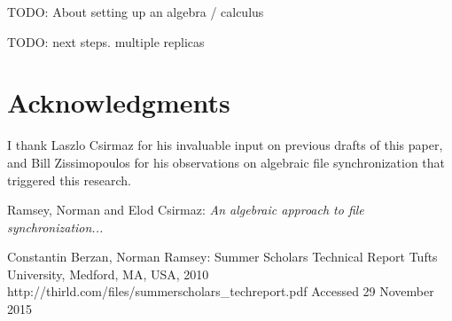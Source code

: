 \documentclass[12pt]{article}
\begin{document}
TODO: About setting up an algebra / calculus

TODO: next steps. multiple replicas

\section{Acknowledgments}

I thank Laszlo Csirmaz for his invaluable input on previous drafts of this paper,
and Bill Zissimopoulos for his observations on algebraic file synchronization that triggered this research.



\begin{thebibliography}{99}

 Ramsey, Norman and Elod Csirmaz: {\it An algebraic approach to
file synchronization...}

 Constantin Berzan, Norman Ramsey: Summer Scholars Technical Report
Tufts University, Medford, MA, USA, 2010
http://thirld.com/files/summerscholars\_techreport.pdf
Accessed 29 November 2015


\end{thebibliography}
\end{document}
